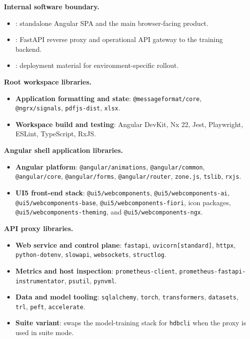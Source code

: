 \documentclass[11pt,a4paper]{article}
\begin{document}
\textbf{Internal software boundary.}
\begin{itemize}[leftmargin=*]
    \item {}: standalone Angular SPA and the main browser-facing product.
    \item {}: FastAPI reverse proxy and operational API gateway to the training backend.
    \item {}: deployment material for environment-specific rollout.
\end{itemize}

\textbf{Root workspace libraries.}
\begin{itemize}[leftmargin=*]
    \item \textbf{Application formatting and state}: \texttt{@messageformat/core}, \texttt{@ngrx/signals}, \texttt{pdfjs-dist}, \texttt{xlsx}.
    \item \textbf{Workspace build and testing}: Angular DevKit, Nx 22, Jest, Playwright, ESLint, TypeScript, RxJS.
\end{itemize}

\textbf{Angular shell application libraries.}
\begin{itemize}[leftmargin=*]
    \item \textbf{Angular platform}: \texttt{@angular/animations}, \texttt{@angular/common}, \texttt{@angular/core}, \texttt{@angular/forms}, \texttt{@angular/router}, \texttt{zone.js}, \texttt{tslib}, \texttt{rxjs}.
    \item \textbf{UI5 front-end stack}: \texttt{@ui5/webcomponents}, \texttt{@ui5/webcomponents-ai}, \texttt{@ui5/webcomponents-base}, \texttt{@ui5/webcomponents-fiori}, icon packages, \texttt{@ui5/webcomponents-theming}, and \texttt{@ui5/webcomponents-ngx}.
\end{itemize}

\textbf{API proxy libraries.}
\begin{itemize}[leftmargin=*]
    \item \textbf{Web service and control plane}: \texttt{fastapi}, \texttt{uvicorn[standard]}, \texttt{httpx}, \texttt{python-dotenv}, \texttt{slowapi}, \texttt{websockets}, \texttt{structlog}.
    \item \textbf{Metrics and host inspection}: \texttt{prometheus-client}, \texttt{prometheus-fastapi-instrumentator}, \texttt{psutil}, \texttt{pynvml}.
    \item \textbf{Data and model tooling}: \texttt{sqlalchemy}, \texttt{torch}, \texttt{transformers}, \texttt{datasets}, \texttt{trl}, \texttt{peft}, \texttt{accelerate}.
    \item \textbf{Suite variant}:  swaps the model-training stack for \texttt{hdbcli} when the proxy is used in suite mode.
\end{itemize}
\end{document}
